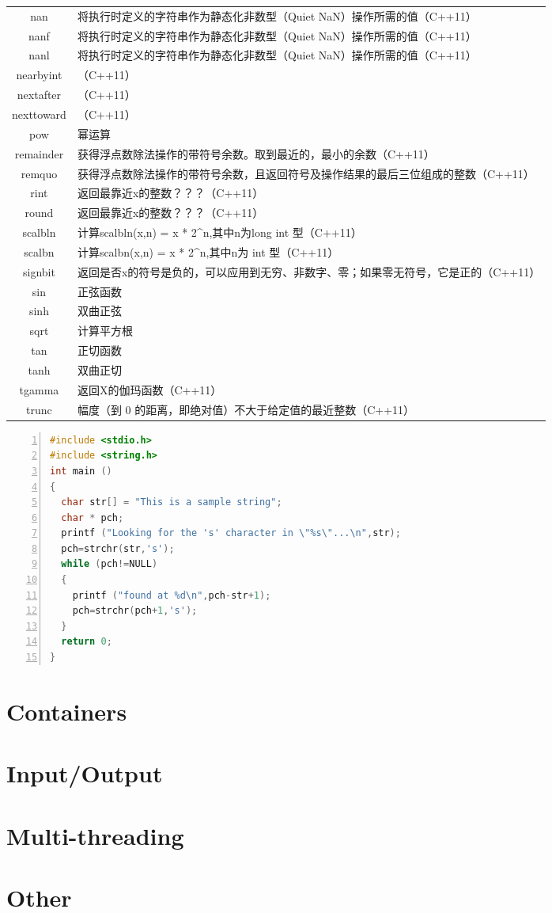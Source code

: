 \documentclass[11pt,a4paper,titlepage]{book}
\begin{document}
\begin{supertabular}{cl}
nan& 将执行时定义的字符串作为静态化非数型（Quiet NaN）操作所需的值（C++11）\\
nanf& 将执行时定义的字符串作为静态化非数型（Quiet NaN）操作所需的值（C++11）\\
nanl& 将执行时定义的字符串作为静态化非数型（Quiet NaN）操作所需的值（C++11）\\
nearbyint& （C++11）\\
nextafter& （C++11）\\
nexttoward& （C++11）\\
pow& 幂运算\\
remainder& 获得浮点数除法操作的带符号余数。取到最近的，最小的余数（C++11）\\
remquo& 获得浮点数除法操作的带符号余数，且返回符号及操作结果的最后三位组成的整数（C++11）\\
rint& 返回最靠近x的整数？？？（C++11）\\
round& 返回最靠近x的整数？？？（C++11）\\
scalbln& 计算scalbln(x,n) = x * 2\^{}n,其中n为long int 型（C++11）\\
scalbn& 计算scalbn(x,n) = x * 2\^{}n,其中n为 int 型（C++11）\\
signbit& 返回是否x的符号是负的，可以应用到无穷、非数字、零；如果零无符号，它是正的（C++11）\\
sin& 正弦函数\\
sinh& 双曲正弦\\
sqrt& 计算平方根\\
tan& 正切函数\\
tanh& 双曲正切\\
tgamma& 返回X的伽玛函数（C++11）\\
trunc& 幅度（到 0 的距离，即绝对值）不大于给定值的最近整数（C++11）\\
\hline
\end{supertabular}

\begin{lstlisting}[language=C++, numbers=left]
#include <stdio.h>
#include <string.h>
int main ()
{
  char str[] = "This is a sample string";
  char * pch;
  printf ("Looking for the 's' character in \"%s\"...\n",str);
  pch=strchr(str,'s');
  while (pch!=NULL)
  {
    printf ("found at %d\n",pch-str+1);
    pch=strchr(pch+1,'s');
  }
  return 0;
}
\end{lstlisting}


\chapter{Containers}


\chapter{Input/Output}



\chapter{Multi-threading}



\chapter{Other}
\end{document}
